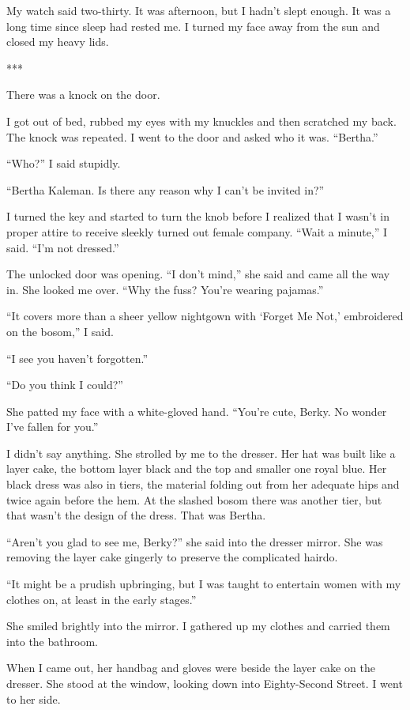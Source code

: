 {My watch said two-thirty. It was afternoon, but I hadn’t slept enough. It was a long time since sleep had rested me. I turned my face away from the sun and closed my heavy lids.

***

There was a knock on the door.

I got out of bed, rubbed my eyes with my knuckles and then scratched my back. The knock was repeated. I went to the door and asked who it was. “Bertha.”

“Who?” I said stupidly.

“Bertha Kaleman. Is there any reason why I can’t be invited in?”

I turned the key and started to turn the knob before I realized that I wasn’t in proper attire to receive sleekly turned out female company. “Wait a minute,” I said. “I’m not dressed.”

The unlocked door was opening. “I don’t mind,” she said and came all the way in. She looked me over. “Why the fuss? You’re wearing pajamas.”

“It covers more than a sheer yellow nightgown with ‘Forget Me Not,’ embroidered on the bosom,” I said.

“I see you haven’t forgotten.”

“Do you think I could?”

She patted my face with a white-gloved hand. “You’re cute, Berky. No wonder I’ve fallen for you.”

I didn’t say anything. She strolled by me to the dresser. Her hat was built like a layer cake, the bottom layer black and the top and smaller one royal blue. Her black dress was also in tiers, the material folding out from her adequate hips and twice again before the hem. At the slashed bosom there was another tier, but that wasn’t the design of the dress. That was Bertha.

“Aren’t you glad to see me, Berky?” she said into the dresser mirror. She was removing the layer cake gingerly to preserve the complicated hairdo.

“It might be a prudish upbringing, but I was taught to entertain women with my clothes on, at least in the early stages.”

She smiled brightly into the mirror. I gathered up my clothes and carried them into the bathroom.

When I came out, her handbag and gloves were beside the layer cake on the dresser. She stood at the window, looking down into Eighty-Second Street. I went to her side.

}
